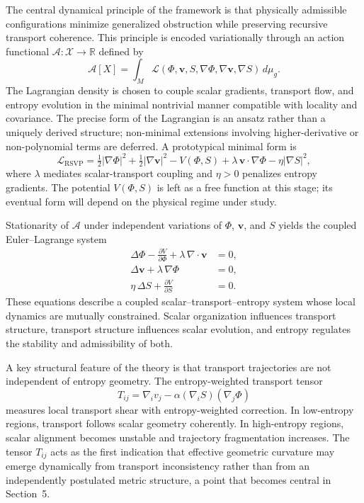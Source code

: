 \documentclass[12pt,a4paper]{article}
\newcommand{\RSVP}{\textrm{RSVP}}
\newcommand{\Field}{\mathcal{X}}
\newcommand{\R}{\mathbb{R}}
\begin{document}
The central dynamical principle of the framework is that physically admissible
configurations minimize generalized obstruction while preserving recursive
transport coherence. This principle is encoded variationally through an action
functional $\mathcal{A}:\Field\to\R$ defined by
\[
\mathcal{A}[X]
= \int_M
\mathcal{L}(\Phi,\mathbf{v},S,\nabla\Phi,\nabla\mathbf{v},\nabla S)
\, d\mu_g.
\]
The Lagrangian density is chosen to couple scalar gradients, transport flow,
and entropy evolution in the minimal nontrivial manner compatible with locality
and covariance. The precise form of the Lagrangian is an ansatz rather than a
uniquely derived structure; non-minimal extensions involving higher-derivative
or non-polynomial terms are deferred. A prototypical minimal form is
\[
\mathcal{L}_\RSVP
= \tfrac{1}{2}|\nabla\Phi|^2
+ \tfrac{1}{2}|\nabla\mathbf{v}|^2
- V(\Phi,S)
+ \lambda\,\mathbf{v}\cdot\nabla\Phi
- \eta|\nabla S|^2,
\]
where $\lambda$ mediates scalar-transport coupling and $\eta>0$ penalizes
entropy gradients. The potential $V(\Phi,S)$ is left as a free function at this
stage; its eventual form will depend on the physical regime under study.

Stationarity of $\mathcal{A}$ under independent variations of $\Phi$,
$\mathbf{v}$, and $S$ yields the coupled Euler--Lagrange system
\begin{align*}
\Delta\Phi - \tfrac{\partial V}{\partial\Phi} + \lambda\,\nabla\cdot\mathbf{v} &= 0,\\
\Delta\mathbf{v} + \lambda\,\nabla\Phi &= 0,\\
\eta\,\Delta S + \tfrac{\partial V}{\partial S} &= 0.
\end{align*}
These equations describe a coupled scalar--transport--entropy system whose local
dynamics are mutually constrained. Scalar organization influences transport
structure, transport structure influences scalar evolution, and entropy regulates
the stability and admissibility of both.

A key structural feature of the theory is that transport trajectories are not
independent of entropy geometry. The entropy-weighted transport tensor
\[
T_{ij} = \nabla_i v_j - \alpha(\nabla_i S)(\nabla_j\Phi)
\]
measures local transport shear with entropy-weighted correction. In low-entropy
regions, transport follows scalar geometry coherently. In high-entropy regions,
scalar alignment becomes unstable and trajectory fragmentation increases. The
tensor $T_{ij}$ acts as the first indication that effective geometric curvature
may emerge dynamically from transport inconsistency rather than from an
independently postulated metric structure, a point that becomes central in
Section~5.
\end{document}
